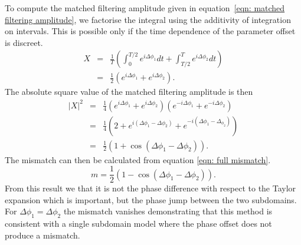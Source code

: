 To compute the matched filtering amplitude given in equation~\eqref{eqn: matched
filtering amplitude}, we factorise the integral using the additivity of
integration on intervals. This is possible only if the time dependence of the
parameter offset is discreet. 
\begin{eqnarray}
X & = &\frac{1}{T }\left(\int_{0}^{T /2}e^{i\Delta\phi_{1}} dt  + 
\int_{T/2}^{T} e^{i\Delta\phi_{2}}dt\right)\\
& = & \frac{1}{2}\left(e^{i\Delta\phi_{1}} + e^{i\Delta\phi_{2}}\right).
\end{eqnarray}
The absolute square value of the matched filtering amplitude is then
\begin{eqnarray}
|X|^{2}& = &\frac{1}{4}\left(e^{i\Delta\phi_{1}} + e^{i\Delta\phi_{2}}\right) \left(e^{-i\Delta\phi_{1}} + e^{-i\Delta\phi_{2}}\right)\\
& = &\frac{1}{4} \left(2 + e^{i(\Delta\phi_{1} - \Delta \phi_{2})} +  e^{-i(\Delta\phi_{1} - \Delta_{\phi_{2}})} \right) \\
& = &\frac{1}{2}\left(1 + \cos(\Delta\phi_{1} - \Delta\phi_{2})\right).
\end{eqnarray}
The mismatch can then be calculated from equation \eqref{eqn: full mismatch}.
\begin{equation}
m = \frac{1}{2}\left(1 - \cos(\Delta\phi_{1} - \Delta\phi_{2})\right).
\label{eqn: two subdomain phase mismatch}
\end{equation}
From this result we that it is not the phase difference with respect to the
Taylor expansion which is important, but the phase jump between the two
subdomains. For $\Delta \phi_{1} = \Delta \phi_{2}$ the mismatch vanishes
demonstrating that this method is consistent with a single subdomain model where
the phase offset does not produce a mismatch.


